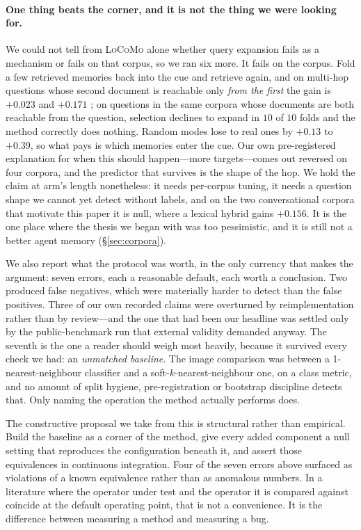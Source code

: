 \paragraph{One thing beats the corner, and it is not the thing we were looking for.} We
could not tell from \textsc{LoCoMo} alone whether query expansion fails as a mechanism or
fails on that corpus, so we ran six more. It fails on the corpus. Fold a few retrieved
memories back into the cue and retrieve again, and on multi-hop questions whose second
document is reachable only \emph{from the first} the gain is $+0.023$ 
and $+0.171$ ; on questions in the same corpora whose documents are both
reachable from the question, selection declines to expand in $10$ of $10$ folds and the
method correctly does nothing. Random modes lose to real ones by $+0.13$ to $+0.39$, so what
pays is which memories enter the cue. Our own pre-registered explanation for when this
should happen---more targets---comes out reversed on four corpora, and the predictor that
survives is the shape of the hop. We hold the claim at arm's length nonetheless: it needs
per-corpus tuning, it needs a question shape we cannot yet detect without labels, and on the
two conversational corpora that motivate this paper it is null, where a lexical hybrid gains
$+0.156$. It is the one place where the thesis we began with was too pessimistic, and it is
still not a better agent memory (\S\ref{sec:corpora}).

We also report what the protocol was worth, in the only currency that makes the argument:
seven errors, each a reasonable default, each worth a conclusion. Two produced false
negatives, which were materially harder to detect than the false positives. Three of our own
recorded claims were overturned by reimplementation rather than by review---and the one that
had been our headline was settled only by the public-benchmark run that external validity
demanded anyway. The seventh is the one a reader should weigh most heavily, because it
survived every check we had: an \emph{unmatched baseline}. The image comparison was between
a 1-nearest-neighbour classifier and a soft-$k$-nearest-neighbour one, on a class metric,
and no amount of split hygiene, pre-registration or bootstrap discipline detects that. Only
naming the operation the method actually performs does.

The constructive proposal we take from this is structural rather than empirical. Build the
baseline as a corner of the method, give every added component a null setting that reproduces
the configuration beneath it, and assert those equivalences in continuous integration. Four
of the seven errors above surfaced as violations of a known equivalence rather than as
anomalous numbers. In a literature where the operator under test and the operator it is
compared against coincide at the default operating point, that is not a convenience. It is
the difference between measuring a method and measuring a bug.
